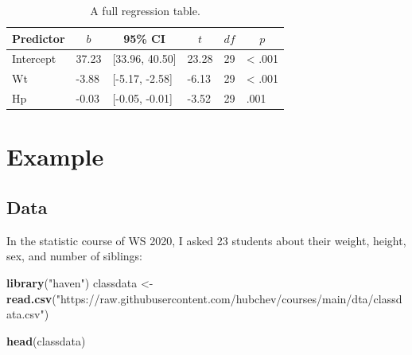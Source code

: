 \documentclass[
  doc]{apa6}
\newenvironment{Shaded}{\begin{snugshade}}{\end{snugshade}}
\newcommand{\AttributeTok}[1]{\textcolor[rgb]{0.13,0.29,0.53}{#1}}
\newcommand{\FunctionTok}[1]{\textcolor[rgb]{0.13,0.29,0.53}{\textbf{#1}}}
\newcommand{\NormalTok}[1]{#1}
\newcommand{\OtherTok}[1]{\textcolor[rgb]{0.56,0.35,0.01}{#1}}
\newcommand{\SpecialCharTok}[1]{\textcolor[rgb]{0.81,0.36,0.00}{\textbf{#1}}}
\newcommand{\StringTok}[1]{\textcolor[rgb]{0.31,0.60,0.02}{#1}}
\begin{document}
\begin{Shaded}
\end{Shaded}

\begin{table}[tbp]

\begin{center}
\begin{threeparttable}

\caption{\label{tab:unnamed-chunk-7}A full regression table.}

\begin{tabular}{llllll}
\toprule
Predictor & \multicolumn{1}{c}{$b$} & \multicolumn{1}{c}{95\% CI} & \multicolumn{1}{c}{$t$} & \multicolumn{1}{c}{$\mathit{df}$} & \multicolumn{1}{c}{$p$}\\
\midrule
Intercept & 37.23 & {}[33.96, 40.50] & 23.28 & 29 & < .001\\
Wt & -3.88 & {}[-5.17, -2.58] & -6.13 & 29 & < .001\\
Hp & -0.03 & {}[-0.05, -0.01] & -3.52 & 29 & .001\\
\bottomrule
\end{tabular}

\end{threeparttable}
\end{center}

\end{table}

\newpage

\section{Example}\label{example}

\subsection{Data}\label{data}

In the statistic course of WS 2020, I asked 23 students about their weight, height, sex, and number of siblings:

\begin{Shaded}
\begin{Highlighting}[]
\FunctionTok{library}\NormalTok{(}\StringTok{"haven"}\NormalTok{)}
\NormalTok{classdata }\OtherTok{\textless{}{-}} \FunctionTok{read.csv}\NormalTok{(}\StringTok{"https://raw.githubusercontent.com/hubchev/courses/main/dta/classdata.csv"}\NormalTok{)}

\FunctionTok{head}\NormalTok{(classdata)}
\end{Highlighting}
\end{Shaded}
\end{document}
